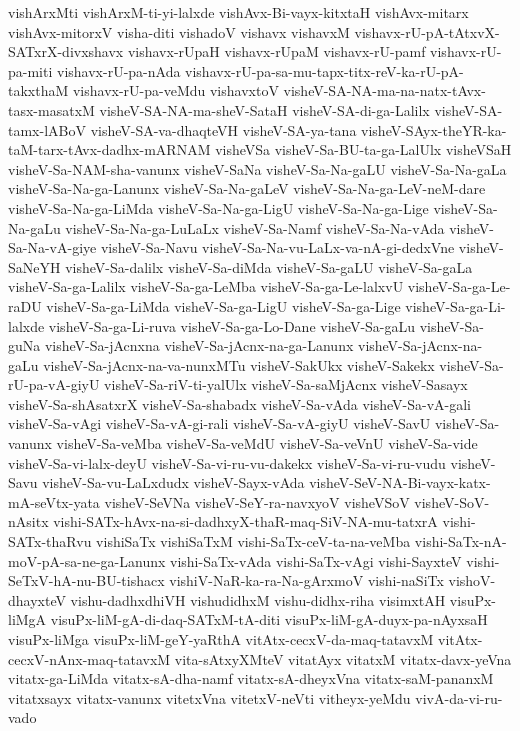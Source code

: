 {vishArxMti
vishArxM-ti-yi-lalxde
vishAvx-Bi-vayx-kitxtaH
vishAvx-mitarx
vishAvx-mitorxV
visha-diti
vishadoV
vishavx
vishavxM
vishavx-rU-pA-tAtxvX-SATxrX-divxshavx
vishavx-rUpaH
vishavx-rUpaM
vishavx-rU-pamf
vishavx-rU-pa-miti
vishavx-rU-pa-nAda
vishavx-rU-pa-sa-mu-tapx-titx-reV-ka-rU-pA-takxthaM
vishavx-rU-pa-veMdu
vishavxtoV
visheV-SA-NA-ma-na-natx-tAvx-tasx-masatxM
visheV-SA-NA-ma-sheV-SataH
visheV-SA-di-ga-Lalilx
visheV-SA-tamx-lABoV
visheV-SA-va-dhaqteVH
visheV-SA-ya-tana
visheV-SAyx-theYR-ka-taM-tarx-tAvx-dadhx-mARNAM
visheVSa
visheV-Sa-BU-ta-ga-LalUlx
visheVSaH
visheV-Sa-NAM-sha-vanunx
visheV-SaNa
visheV-Sa-Na-gaLU
visheV-Sa-Na-gaLa
visheV-Sa-Na-ga-Lanunx
visheV-Sa-Na-gaLeV
visheV-Sa-Na-ga-LeV-neM-dare
visheV-Sa-Na-ga-LiMda
visheV-Sa-Na-ga-LigU
visheV-Sa-Na-ga-Lige
visheV-Sa-Na-gaLu
visheV-Sa-Na-ga-LuLaLx
visheV-Sa-Namf
visheV-Sa-Na-vAda
visheV-Sa-Na-vA-giye
visheV-Sa-Navu
visheV-Sa-Na-vu-LaLx-va-nA-gi-dedxVne
visheV-SaNeYH
visheV-Sa-dalilx
visheV-Sa-diMda
visheV-Sa-gaLU
visheV-Sa-gaLa
visheV-Sa-ga-Lalilx
visheV-Sa-ga-LeMba
visheV-Sa-ga-Le-lalxvU
visheV-Sa-ga-Le-raDU
visheV-Sa-ga-LiMda
visheV-Sa-ga-LigU
visheV-Sa-ga-Lige
visheV-Sa-ga-Li-lalxde
visheV-Sa-ga-Li-ruva
visheV-Sa-ga-Lo-Dane
visheV-Sa-gaLu
visheV-Sa-guNa
visheV-Sa-jAcnxna
visheV-Sa-jAcnx-na-ga-Lanunx
visheV-Sa-jAcnx-na-gaLu
visheV-Sa-jAcnx-na-va-nunxMTu
visheV-SakUkx
visheV-Sakekx
visheV-Sa-rU-pa-vA-giyU
visheV-Sa-riV-ti-yalUlx
visheV-Sa-saMjAcnx
visheV-Sasayx
visheV-Sa-shAsatxrX
visheV-Sa-shabadx
visheV-Sa-vAda
visheV-Sa-vA-gali
visheV-Sa-vAgi
visheV-Sa-vA-gi-rali
visheV-Sa-vA-giyU
visheV-SavU
visheV-Sa-vanunx
visheV-Sa-veMba
visheV-Sa-veMdU
visheV-Sa-veVnU
visheV-Sa-vide
visheV-Sa-vi-lalx-deyU
visheV-Sa-vi-ru-vu-dakekx
visheV-Sa-vi-ru-vudu
visheV-Savu
visheV-Sa-vu-LaLxdudx
visheV-Sayx-vAda
visheV-SeV-NA-Bi-vayx-katx-mA-seVtx-yata
visheV-SeVNa
visheV-SeY-ra-navxyoV
visheVSoV
visheV-SoV-nAsitx
vishi-SATx-hAvx-na-si-dadhxyX-thaR-maq-SiV-NA-mu-tatxrA
vishi-SATx-thaRvu
vishiSaTx
vishiSaTxM
vishi-SaTx-ceV-ta-na-veMba
vishi-SaTx-nA-moV-pA-sa-ne-ga-Lanunx
vishi-SaTx-vAda
vishi-SaTx-vAgi
vishi-SayxteV
vishi-SeTxV-hA-nu-BU-tishacx
vishiV-NaR-ka-ra-Na-gArxmoV
vishi-naSiTx
vishoV-dhayxteV
vishu-dadhxdhiVH
vishudidhxM
vishu-didhx-riha
visimxtAH
visuPx-liMgA
visuPx-liM-gA-di-daq-SATxM-tA-diti
visuPx-liM-gA-duyx-pa-nAyxsaH
visuPx-liMga
visuPx-liM-geY-yaRthA
vitAtx-cecxV-da-maq-tatavxM
vitAtx-cecxV-nAnx-maq-tatavxM
vita-sAtxyXMteV
vitatAyx
vitatxM
vitatx-davx-yeVna
vitatx-ga-LiMda
vitatx-sA-dha-namf
vitatx-sA-dheyxVna
vitatx-saM-pananxM
vitatxsayx
vitatx-vanunx
vitetxVna
vitetxV-neVti
vitheyx-yeMdu
vivA-da-vi-ru-vado
}
